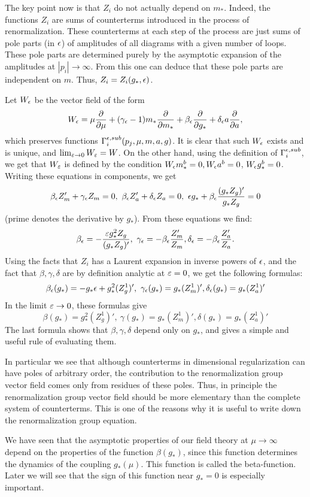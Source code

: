 The key point now is that $Z_i$ do not actually depend on $m_*$.
Indeed, the functions $Z_i$ are sums of counterterms introduced
in the process of renormalization. These counterterms at each step
of the process
are just sums of pole parts (in $\epsilon$)
of amplitudes of all diagrams with a given number
of loops. These pole parts are determined purely by the 
asymptotic expansion of the amplitudes at $|p_i|\to \infty$.
{}From this one can deduce that these pole parts are independent on $m$. 
Thus, $Z_i=Z_i(g_*,\epsilon)$. 

Let $W_\epsilon$ be the vector field of the form
$$
W_\epsilon=\mu\frac{\partial}{\partial\mu}+(\gamma_\epsilon-1) 
m_*\frac{\partial}{\partial m_*}+\beta_\epsilon
\frac{\partial }{\partial g_*}
+\delta_\epsilon a\frac{\partial}{\partial a},
$$
which preserves functions $\Gamma_i^{\epsilon,sub}(p_j,\mu,m,a,g)$.
It is clear that such $W_\epsilon$ exists and is unique, and 
$\lim_{\varepsilon\to 0}W_\varepsilon=W$. On the other hand, using the definition of 
$\Gamma_i^{\epsilon,sub}$, we get that $W_\varepsilon$ is defined by the condition 
$W_\epsilon m_*^b=0,W_\epsilon a^b=0$, $W_\epsilon g_*^b=0$. Writing these equations in 
components, we get
$$
\beta_\epsilon Z_m'+\gamma_\epsilon Z_m=0,\
\beta_\epsilon Z_a'+\delta_\epsilon Z_a=0,\ \epsilon g_*+\beta_\epsilon\frac{(g_*Z_g)'}
{g_*Z_g}=0
$$
(prime denotes the derivative by $g_*$). From these equations we find:
$$
\beta_\eps=-\frac{\e g_*^2Z_g}{(g_*Z_g)'},\ \gamma_\eps=-\beta_\eps 
\frac{Z_m'}{Z_m}, \delta_\eps=-\beta_\eps\frac{Z_a'}{Z_a}.
$$
Using the facts that $Z_i$ has a Laurent expansion in inverse powers of 
$\epsilon$, and the fact that $\beta,\gamma,\delta$ are by definition analytic at 
$\varepsilon=0$, we get the following formulas:
$$
\beta_\epsilon(g_*)=-g_*\epsilon+g_*^2(Z_g^1)',  \
\gamma_\epsilon(g_*)=g_*(Z_m^1)', \delta_\epsilon(g_*)=g_*(Z_a^1)'
$$
In the limit $\varepsilon\to 0$, these formulas give
$$
\beta(g_*)=g_*^2(Z_g^1)',  \
\gamma(g_*)=g_*(Z_m^1)', \delta(g_*)=g_*(Z_a^1)'
$$
The last formula shows that $\beta,\gamma,\delta$ depend only on $g_*$, and
gives a simple and useful rule of evaluating them. 

In particular we see that although counterterms in dimensional regularization 
can have poles of arbitrary order, the contribution to the renormalization 
group vector field comes only from residues of these poles. Thus, in principle 
the renormalization group vector field should be more elementary 
than the complete system of counterterms. This is one of the reasons 
why it is useful to write down the renormalization group equation.

We have seen 
that the asymptotic properties of our field theory at $\mu\to\infty$ 
depend  on the properties of the function $\beta(g_*)$, since this function
determines the dynamics of the coupling $g_*(\mu)$. 
This function is called the beta-function. Later we will see 
that the sign of this function near $g_*=0$ is especially important. 


